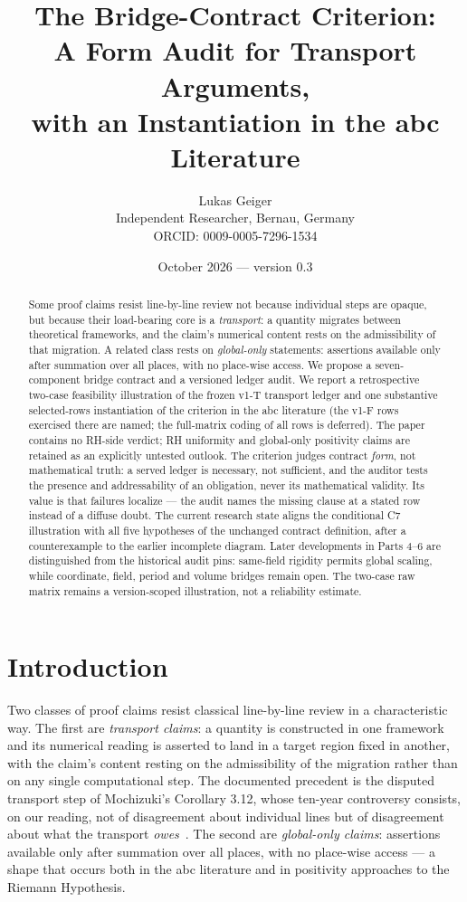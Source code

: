\documentclass[11pt,a4paper]{article}
\title{The Bridge-Contract Criterion:\\A Form Audit for Transport Arguments,\\with an Instantiation in the abc Literature}
\author{Lukas Geiger\\\small Independent Researcher, Bernau, Germany\\\small ORCID: 0009-0005-7296-1534}
\date{October 2026 --- version 0.3}
\begin{document}
\maketitle

\begin{abstract}
Some proof claims resist line-by-line review not because individual steps are
opaque, but because their load-bearing core is a \emph{transport}: a quantity
migrates between theoretical frameworks, and the claim's numerical content rests
on the admissibility of that migration. A related class rests on
\emph{global-only} statements: assertions available only after summation over all
places, with no place-wise access. We propose a seven-component bridge contract
and a versioned ledger audit. We report a retrospective two-case feasibility
illustration of the frozen v1-T transport ledger and one substantive
selected-rows instantiation of the criterion in the abc literature (the
v1-F rows exercised there are named; the full-matrix coding of all rows is
deferred). The paper contains no
RH-side verdict; RH uniformity and global-only positivity claims are retained as
an explicitly untested outlook. The criterion judges contract \emph{form}, not
mathematical truth: a served ledger is necessary, not sufficient, and the auditor
tests the presence and addressability of an obligation, never its mathematical
validity. Its value is that failures localize --- the audit names the missing
clause at a stated row instead of a diffuse doubt.
The current research state aligns the conditional C7 illustration with all five
hypotheses of the unchanged contract definition, after a counterexample to the
earlier incomplete diagram. Later developments in Parts 4--6 are distinguished
from the historical audit pins: same-field rigidity permits global scaling,
while coordinate, field, period and volume bridges remain open. The two-case
raw matrix remains a version-scoped illustration, not a reliability estimate.
\end{abstract}

\clearpage
\tableofcontents
\clearpage

\section{Introduction}\label{sec:intro}

Two classes of proof claims resist classical line-by-line review in a
characteristic way. The first are \emph{transport claims}: a quantity is
constructed in one framework and its numerical reading is asserted to land in
a target region fixed in another, with the claim's content resting on the
admissibility of the migration rather than on any single computational step.
The documented precedent is the disputed transport step of Mochizuki's
Corollary 3.12, whose ten-year controversy consists, on our reading, not of
disagreement about individual lines but of disagreement about what the
transport \emph{owes}~\cite{part1}. The second are \emph{global-only
claims}: assertions available only after summation over all places, with no
place-wise access --- a shape that occurs both in the abc literature and in
positivity approaches to the Riemann Hypothesis.
\end{document}
